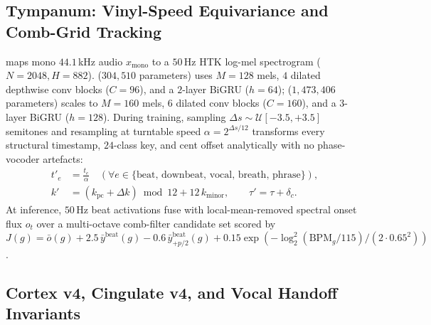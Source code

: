 \subsection{Tympanum: Vinyl-Speed Equivariance and Comb-Grid Tracking}
\label{sec:ear}

 maps mono $44.1$\,kHz audio $x_{\text{mono}}$ to a $50$\,Hz HTK log-mel spectrogram ($N=2048, H=882$).  ($304{,}510$ parameters) uses $M=128$ mels, $4$ dilated depthwise conv blocks ($C=96$), and a $2$-layer BiGRU ($h=64$);  ($1{,}473{,}406$ parameters) scales to $M=160$ mels, $6$ dilated conv blocks ($C=160$), and a $3$-layer BiGRU ($h=128$). During training, sampling $\Delta s \sim \mathcal{U}[-3.5, +3.5]$ semitones and resampling at turntable speed $\alpha = 2^{\Delta s / 12}$ transforms every structural timestamp, $24$-class key, and cent offset analytically with no phase-vocoder artefacts:
\begin{equation}
\begin{aligned}
  t'_e &= \frac{t_e}{\alpha} \quad (\forall e \in \{\text{beat, downbeat, vocal, breath, phrase}\}), \\[-1pt]
  k' &= (k_{\text{pc}} + \Delta k) \bmod 12 + 12\,k_{\text{minor}}, \qquad \tau' = \tau + \delta_c.
\end{aligned}
  \label{eq:vinyl}
\end{equation}
At inference, $50$\,Hz beat activations fuse with local-mean-removed spectral onset flux $o_t$ over a multi-octave comb-filter candidate set scored by $J(g) = \bar{o}(g) + 2.5\,\bar{y}^{\text{beat}}(g) - 0.6\,\bar{y}^{\text{beat}}_{+p/2}(g) + 0.15\exp(-\log_2^2(\mathrm{BPM}_g / 115)/(2\cdot 0.65^2))$.

\subsection{Cortex v4, Cingulate v4, and Vocal Handoff Invariants}
\label{sec:beat}

